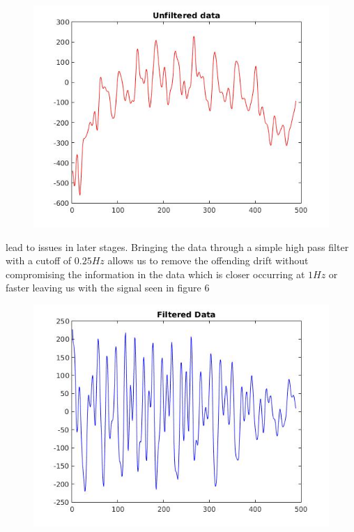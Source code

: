 \documentclass[10pt,twocolumn,letterpaper]{article}
\begin{document}
\begin{figure}[t]
\begin{center}
   \includegraphics[width=0.8\linewidth]{../img/fig4.jpg}
   \caption{}
\end{center}
\end{figure}

lead to issues in later stages.  Bringing the data through a simple high pass filter with a cutoff of $0.25 Hz$ allows us to remove the offending drift without compromising the information in the data which is closer occurring at $1Hz$ or faster leaving us with the signal seen in figure 6

\begin{figure}[t]
\begin{center}
   \includegraphics[width=0.8\linewidth]{../img/fig5.jpg}
   \caption{}
\end{center}
\end{figure}
\end{document}
